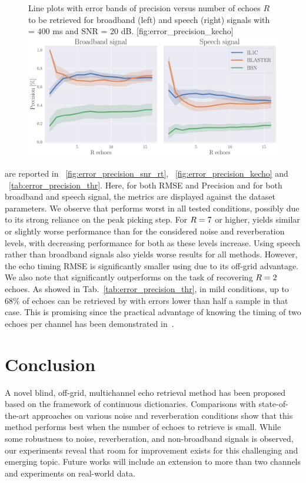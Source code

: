 \begin{figure}[t!]
    \begin{sidecaption}[]{
        Line plots with error bands of precision versus number of echoes $R$ to be retrieved for broadband (left) and speech (right) signals with \RT{} = $400$ ms and SNR = 20 dB.
    }[fig:error_precision_kecho]
    \centering
    \includegraphics[width=\linewidth]{figures/blaster/p_k-7_thr-2_bns_crocco_blaster-peak_withRechoes.pdf}
    \end{sidecaption}
\end{figure}

 are reported in ~\cref{fig:error_precision_snr_rt}, ~\cref{fig:error_precision_kecho} and ~\cref{tab:error_precision_thr}.
Here, for both RMSE and Precision and for both broadband and speech signal, the metrics are displayed against the dataset parameters.
We observe that \algoBsn{} performs worst in all tested conditions, possibly due to its strong reliance on the peak picking step.
For $R=7$ or higher, \algoBraire{} yields similar or slightly worse performance than \algoCrocco{} for the considered noise and reverberation levels, with decreasing performance for both as these levels increase.
Using speech rather than broadband signals also yields worse results for all methods.
However, the echo timing RMSE is significantly smaller using \algoBraire{} due to its off-grid advantage. We also note that \algoBraire{} significantly outperforms \algoCrocco{} on the task of recovering $R=2$ echoes. As showed in Tab.~\ref{tab:error_precision_thr}, in mild conditions, up to 68\% of echoes can be retrieved by \algoBraire{} with errors lower than half a sample in that case.
This is promising since the practical advantage of knowing the timing of two echoes per channel has been demonstrated in~.

\section{Conclusion}
A novel blind, off-grid, multichannel echo retrieval method has been proposed based on the framework of continuous dictionaries.
Comparisons with state-of-the-art approaches on various noise and reverberation conditions show that this method performs best when the number of echoes to retrieve is small.
While some robustness to noise, reverberation, and non-broadband signals is observed, our experiments reveal that room for improvement exists for this challenging and emerging topic.
Future works will include an extension to more than two channels and experiments on real-world data.